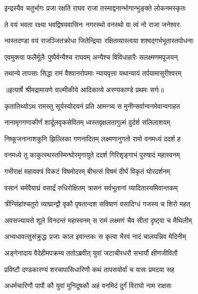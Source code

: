 \twolineshloka
{इन्द्रस्यैव चतुर्भागः प्रजा रक्षति राघव}
{राजा तस्माद्वनान्भोगान्भुङ्क्ते लोकनमस्कृतः} %

\twolineshloka
{ते वयं भवता रक्ष्या भवद्विषयवासिनः}
{नगरस्थो वनस्थो वा त्वं नो राजा जनेश्वरः} %

\twolineshloka
{न्यस्तदण्डा वयं राजञ्जितक्रोधा जितेन्द्रियाः}
{रक्षितव्यास्त्वया शश्वद्गर्भभूतास्तपोधनाः} %

\twolineshloka
{एवमुक्त्वा फलैर्मूलैः पुष्पैर्वन्यैश्च राघवम्}
{अन्यैश्च विविधाहारैः सलक्ष्मणमपूजयन्} %

\twolineshloka
{तथान्ये तापसाः सिद्धा रामं वैश्वानरोपमाः}
{न्यायवृत्ता यथान्यायं तर्पयामासुरीश्वरम्} %


{॥इत्यार्षे श्रीमद्रामायणे वाल्मीकीये आदिकाव्ये अरण्यकाण्डे प्रथमः सर्गः॥}


\twolineshloka
{कृतातिथ्योऽथ रामस्तु सूर्यस्योदयनं प्रति}
{आमन्त्र्य स मुनीन्सर्वान्वनमेवान्वगाहत} %

\twolineshloka
{नानामृगगणाकीर्णं शार्दूलवृकसेवितम्}
{ध्वस्तवृक्षलतागुल्मं दुर्दर्श सलिलाशयम्} %

\twolineshloka
{निष्कूजनानाशकुनि झिल्लिका गणनादितम्}
{लक्ष्मणानुगतो रामो वनमध्यं ददर्श ह} %

\twolineshloka
{वनमध्ये तु काकुत्स्थस्तस्मिन्घोरमृगायुते}
{ददर्श गिरिशृङ्गाभं पुरुषादं महास्वनम्} %

\twolineshloka
{गभीराक्षं महावक्त्रं विकटं विषमोदरम्}
{बीभत्सं विषमं दीर्घं विकृतं घोरदर्शनम्} %

\twolineshloka
{वसानं चर्मवैयाघ्रं वसार्द्रं रुधिरोक्षितम्}
{त्रासनं सर्वभूतानां व्यादितास्यमिवान्तकम्} %

\twolineshloka
{त्रीन्सिंहांश्चतुरो व्याघ्रान्द्वौ वृकौ पृषतान्दश}
{सविषाणं वसादिग्धं गजस्य च शिरो महत्} %

\twolineshloka
{अवसज्यायसे शूले विनदन्तं महास्वनम्}
{स रामं लक्ष्मणं चैव सीतां दृष्ट्वा च मैथिलीम्} %

\twolineshloka
{अभ्यधावत्सुसंक्रुद्धः प्रजाः काल इवान्तकः}
{स कृत्वा भैरवं नादं चालयन्निव मेदिनीम्} %

\twolineshloka
{अङ्गेनादाय वैदेहीमपक्रम्य ततोऽब्रवीत्}
{युवां जटाचीरधरौ सभार्यौ क्षीणजीवितौ} %

\twolineshloka
{प्रविष्टौ दण्डकारण्यं शरचापासिधारिणौ}
{कथं तापसयोर्वां च वासः प्रमदया सह} %

\twolineshloka
{अधर्मचारिणौ पापौ कौ युवां मुनिदूषकौ}
{अहं वनमिदं दुर्गं विराघो नाम राक्षसः} %

